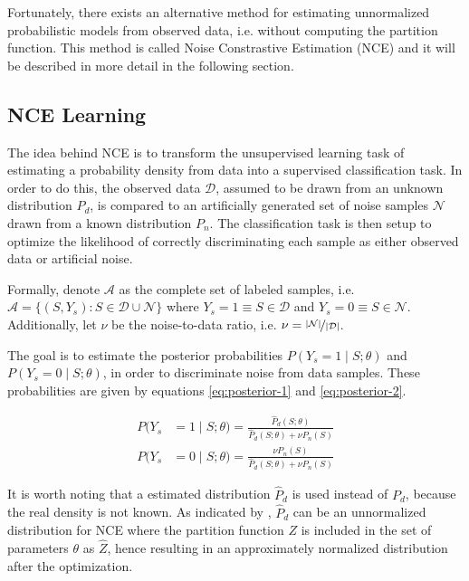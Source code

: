 Fortunately, there exists an alternative method for estimating unnormalized probabilistic models from observed data, i.e. without computing the partition function. This method is called Noise Constrastive Estimation (NCE) \citep{Gutmann12NCE} and it will be described in more detail in the following section.

\subsection{NCE Learning}

The idea behind NCE is to transform the unsupervised learning task of estimating a probability density from data into a supervised classification task. In order to do this, the observed data $\mathcal{D}$, assumed to be drawn from an unknown distribution $P_{d}$, is compared to an artificially generated set of noise samples $\mathcal{N}$ drawn from a known distribution $P_{n}$. The classification task is then setup to optimize the likelihood of correctly discriminating each sample as either observed data or artificial noise.

Formally, denote $\mathcal{A}$ as the complete set of labeled samples, i.e. $\mathcal{A} = \{(S,Y_{s}) : S \in \mathcal{D} \cup \mathcal{N}\}$ where $Y_{s} = 1 \equiv S \in \mathcal{D}$ and $Y_{s} = 0 \equiv S \in \mathcal{N}$. Additionally, let $\nu$ be the noise-to-data ratio, i.e. $\nu = \nicefrac{|\mathcal{N}|}{|\mathcal{D}|}$.

The goal is to estimate the posterior probabilities $P(Y_{s} = 1 \mid S;\theta)$ and $P(Y_{s} = 0 \mid S;\theta)$, in order to discriminate noise from data samples. These probabilities are given by equations \ref{eq:posterior-1} and \ref{eq:posterior-2}.

\begin{align}
  P(Y_{s} &= 1 \mid S;\theta) = \frac{\hat{P}_{d}(S;\theta)}{\hat{P}_{d}(S;\theta) + \nu P_{n}(S)}
  \label{eq:posterior-1} \\
  P(Y_{s} &= 0 \mid S;\theta) = \frac{\nu P_{n}(S)}{\hat{P}_{d}(S;\theta) + \nu P_{n}(S)}
  \label{eq:posterior-2}
\end{align}

It is worth noting that a estimated distribution $\hat{P}_{d}$ is used instead of $P_{d}$, because the real density is not known. As indicated by \citet{Gutmann12NCE}, $\hat{P}_{d}$ can be an unnormalized distribution for NCE where the partition function $Z$ is included in the set of parameters $\theta$ as $\hat{Z}$, hence resulting in an approximately normalized distribution after the optimization.

